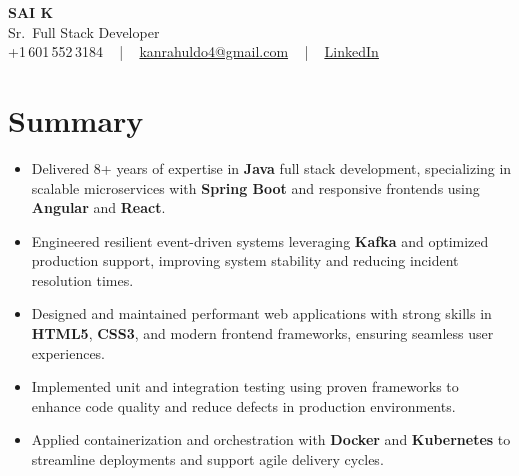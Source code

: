 \documentclass[letterpaper,11pt]{article}
\newcommand{\resumeItem}[1]{
  \item\footnotesize{
    {#1 \vspace{-2pt}}
  }
}
\newcommand{\resumeItemListStart}{\begin{itemize}[leftmargin=*]}
\newcommand{\resumeItemListEnd}{\end{itemize}\vspace{-5pt}}
\begin{document}
\begin{center}
    {\fontsize{14pt}{12pt}\selectfont \textbf{\MakeUppercase{Sai K}}}\\ \vspace{2pt}
    \fontsize{10pt}{12pt}\selectfont Sr.\ Full Stack Developer\\ \vspace{2pt}
    \fontsize{10pt}{12pt}\selectfont +1\,601\,552\,3184 ~ | ~
    \href{mailto:kanrahuldo4@gmail.com}{kanrahuldo4@gmail.com} ~ | ~
    \href{https://www.linkedin.com/in/srrrk/}{\color{blue}\underline{LinkedIn}}
    \vspace{-10pt}
\end{center}

\section{Summary}
\fontsize{9pt}{10pt}\selectfont
\resumeItemListStart
  \resumeItem{Delivered 8+ years of expertise in \textbf{Java} full stack development, specializing in scalable microservices with \textbf{Spring Boot} and responsive frontends using \textbf{Angular} and \textbf{React}.}
  \resumeItem{Engineered resilient event-driven systems leveraging \textbf{Kafka} and optimized production support, improving system stability and reducing incident resolution times.}
  \resumeItem{Designed and maintained performant web applications with strong skills in \textbf{HTML5}, \textbf{CSS3}, and modern frontend frameworks, ensuring seamless user experiences.}
  \resumeItem{Implemented unit and integration testing using proven frameworks to enhance code quality and reduce defects in production environments.}
  \resumeItem{Applied containerization and orchestration with \textbf{Docker} and \textbf{Kubernetes} to streamline deployments and support agile delivery cycles.}
\resumeItemListEnd
\vspace{-6pt}

\end{document}
